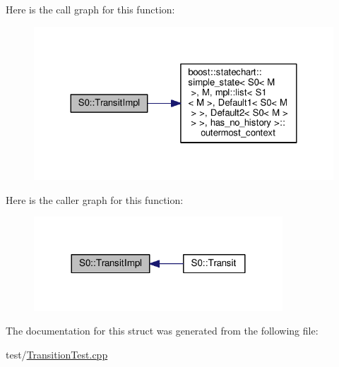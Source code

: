 Here is the call graph for this function\+:
\nopagebreak
\begin{figure}[H]
\begin{center}
\leavevmode
\includegraphics[width=324pt]{struct_s0_a2668ab658c4d0e64fb9bf9881e4c72b6_cgraph}
\end{center}
\end{figure}
Here is the caller graph for this function\+:
\nopagebreak
\begin{figure}[H]
\begin{center}
\leavevmode
\includegraphics[width=264pt]{struct_s0_a2668ab658c4d0e64fb9bf9881e4c72b6_icgraph}
\end{center}
\end{figure}


The documentation for this struct was generated from the following file\+:\begin{DoxyCompactItemize}
\item 
test/\mbox{\hyperlink{_transition_test_8cpp}{Transition\+Test.\+cpp}}\end{DoxyCompactItemize}
